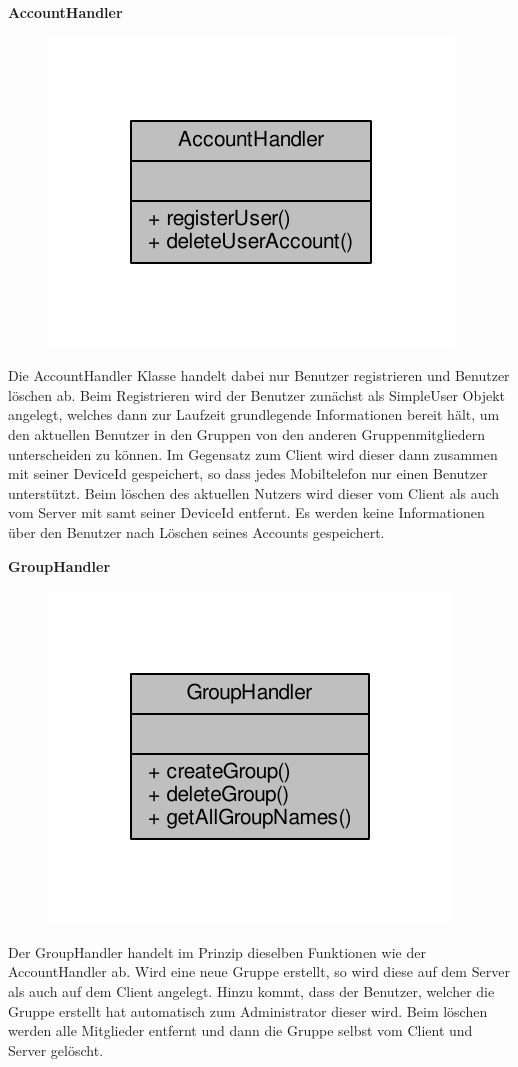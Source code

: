 \textbf{AccountHandler}
\begin{figure}[H]
	\includegraphics[scale = 1]{res/umlClasses/account_handler__coll__graph.pdf}
	\centering
\end{figure}
Die AccountHandler Klasse handelt dabei nur Benutzer registrieren und Benutzer löschen ab.
Beim Registrieren wird der Benutzer zunächst als SimpleUser Objekt angelegt, welches dann zur Laufzeit grundlegende Informationen bereit hält, um den aktuellen Benutzer in den Gruppen von den anderen Gruppenmitgliedern unterscheiden zu können. Im Gegensatz zum Client wird dieser dann zusammen mit seiner DeviceId gespeichert, so dass jedes Mobiltelefon nur einen Benutzer unterstützt.
Beim löschen des aktuellen Nutzers wird dieser vom Client als auch vom Server mit samt seiner DeviceId entfernt. Es werden keine Informationen über den Benutzer nach Löschen seines Accounts gespeichert.

\textbf{GroupHandler}
\begin{figure}[H]
	\includegraphics[scale = 1]{res/umlClasses/group_handler__coll__graph.pdf}
	\centering
\end{figure}
Der GroupHandler handelt im Prinzip dieselben Funktionen wie der AccountHandler ab. Wird eine neue Gruppe erstellt, so wird diese auf dem Server als auch auf dem Client angelegt. Hinzu kommt, dass der Benutzer, welcher die Gruppe erstellt hat automatisch zum Administrator dieser wird.
Beim löschen werden alle Mitglieder entfernt und dann die Gruppe selbst vom Client und Server gelöscht.
